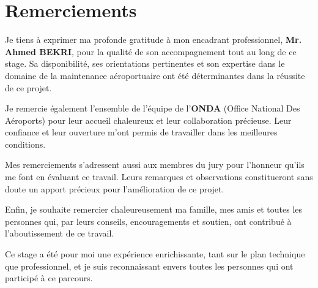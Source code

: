 \chapter*{Remerciements}

\noindent Je tiens à exprimer ma profonde gratitude à mon encadrant professionnel, \textbf{Mr. Ahmed BEKRI}, pour la qualité de son accompagnement tout au long de ce stage. Sa disponibilité, ses orientations pertinentes et son expertise dans le domaine de la maintenance aéroportuaire ont été déterminantes dans la réussite de ce projet.

\vspace{0.5cm}
\noindent Je remercie également l'ensemble de l'équipe de l'\textbf{ONDA} (Office National Des Aéroports) pour leur accueil chaleureux et leur collaboration précieuse. Leur confiance et leur ouverture m'ont permis de travailler dans les meilleures conditions.

\vspace{0.5cm}
\noindent Mes remerciements s'adressent aussi aux membres du jury pour l'honneur qu'ils me font en évaluant ce travail. Leurs remarques et observations constitueront sans doute un apport précieux pour l'amélioration de ce projet.

\vspace{0.5cm}
\noindent Enfin, je souhaite remercier chaleureusement ma famille, mes amis et toutes les personnes qui, par leurs conseils, encouragements et soutien, ont contribué à l'aboutissement de ce travail.

\vspace{0.5cm}
\noindent Ce stage a été pour moi une expérience enrichissante, tant sur le plan technique que professionnel, et je suis reconnaissant envers toutes les personnes qui ont participé à ce parcours.
